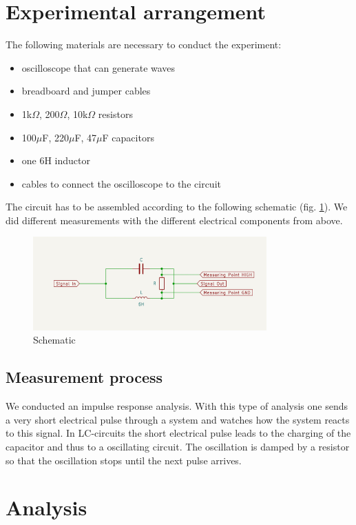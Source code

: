 \documentclass{article}
\begin{document}
\section{Experimental arrangement}
The following materials are necessary to conduct the experiment:
\begin{itemize}
    \item oscilloscope that can generate waves
    \item breadboard and jumper cables
    \item 1k$\Omega$, 200$\Omega$, 10k$\Omega$ resistors
    \item 100$\mu$F, 220$\mu$F, 47$\mu$F capacitors
    \item one 6H inductor
    \item cables to connect the oscilloscope to the circuit
\end{itemize}

The circuit has to be assembled according to the following schematic (fig. \ref{fig:schematic}). We did different measurements with the different electrical components from above. 

\begin{figure}[!ht]
    \centering
    \includegraphics[width=0.8\textwidth]{images/Screenshot 2023-04-05 at 21.19.41.png}
    \caption{Schematic}
    \label{fig:schematic}
\end{figure}

\subsection{Measurement process}
We conducted an impulse response analysis. With this type of analysis one sends a very short electrical pulse through a system and watches how the system reacts to this signal. In LC-circuits the short electrical pulse leads to the charging of the capacitor and thus to a oscillating circuit. The oscillation is damped by a resistor so that the oscillation stops until the next pulse arrives.

\section{Analysis}
\end{document}
